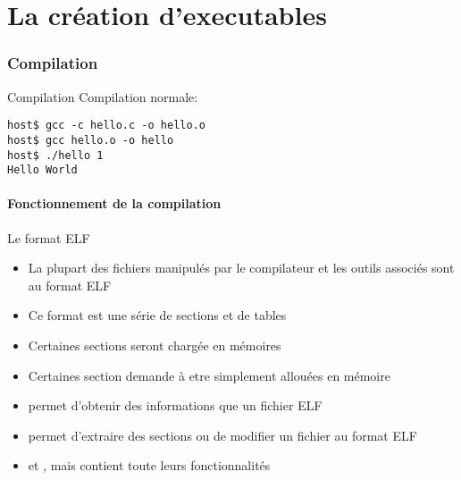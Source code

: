 %
%
%

\part{La création d'executables}

\begin{frame}
  \partpage
\end{frame}

\begin{frame}
  \tableofcontents[currentpart]
\end{frame}

\section{Compilation}

\begin{frame}[fragile=singleslide]{Compilation}
  Compilation normale:
  \begin{lstlisting}
host$ gcc -c hello.c -o hello.o
host$ gcc hello.o -o hello
host$ ./hello 1
Hello World
  \end{lstlisting} %
\end{frame}

\subsection{Fonctionnement de la compilation}

\begin{frame}[fragile=singleslide]{Le format ELF}
  \begin{itemize}
  \item La  plupart des fichiers  manipulés par le compilateur  et les
    outils associés sont au format ELF
  \item Ce format est une série de sections et de tables
  \item  Certaines sections seront chargée en mémoires
  \item  Certaines  section  demande  à etre  simplement  allouées  en
    mémoire
  \item  {} permet  d'obtenir des  informations  que un
    fichier ELF
  \item  {}  permet   d'extraire  des  sections  ou  de
    modifier un fichier au format ELF
  \item {}  et , mais   contient
    toute leurs fonctionnalités
  \end{itemize}
\end{frame}

